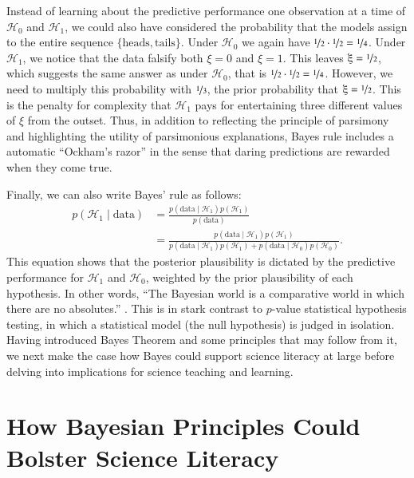\documentclass[man]{apa7}
\begin{document}
Instead of learning about the predictive performance one observation at a time of $\mathcal{H}_0$ and $\mathcal{H}_1$, we could also have considered the probability that the models assign to the entire sequence $\{\text{heads}, \text{tails}\}$. Under $\mathcal{H}_0$ we again have $\nicefrac{1}{2} \cdot \nicefrac{1}{2} = \nicefrac{1}{4}$. Under $\mathcal{H}_1$, we notice that the data falsify both $\xi=0$ and $\xi=1$. This leaves $\xi=\nicefrac{1}{2}$, which suggests the same answer as under $\mathcal{H}_0$, that is $\nicefrac{1}{2} \cdot \nicefrac{1}{2} = \nicefrac{1}{4}$. However, we need to multiply this probability with $\nicefrac{1}{3}$, the prior probability that $\xi=\nicefrac{1}{2}$. This is the penalty for complexity that $\mathcal{H}_1$ pays for entertaining three different values of $\xi$ from the outset. Thus, in addition to reflecting the principle of parsimony and highlighting the utility of parsimonious explanations, Bayes rule includes a automatic ``Ockham's razor'' \parencite{Jeffreys1939,JefferysBerger1992} in the sense that daring predictions are rewarded when they come true.

Finally, we can also write Bayes' rule as follows:
\begin{equation}
\begin{split}
    p(\mathcal{H}_1 \mid \text{data})& = \frac{p(\text{data} \mid \mathcal{H}_1) p(\mathcal{H}_1)}{p(\text{data})}\\
    & = \frac{p(\text{data} \mid \mathcal{H}_1) p(\mathcal{H}_1)}{p(\text{data} \mid \mathcal{H}_1) p(\mathcal{H}_1) + p(\text{data} \mid \mathcal{H}_0) p(\mathcal{H}_0)}.
\end{split}
\end{equation}
This equation shows that the posterior plausibility is dictated by the predictive performance for $\mathcal{H}_1$ and $\mathcal{H}_0$, weighted by the prior plausibility of each hypothesis. In other words, ``The Bayesian world is a comparative world in which there are no absolutes.'' \parencite[p. 308]{Lindley2000}. This is in stark contrast to $p$-value statistical hypothesis testing, in which a statistical model (the null hypothesis) is judged in isolation. \\ 

Having introduced Bayes Theorem and some principles that may follow from it, we next make the case how Bayes could support science literacy at large before delving into implications for science teaching and learning.

\section{How Bayesian Principles Could Bolster Science Literacy}
\end{document}
